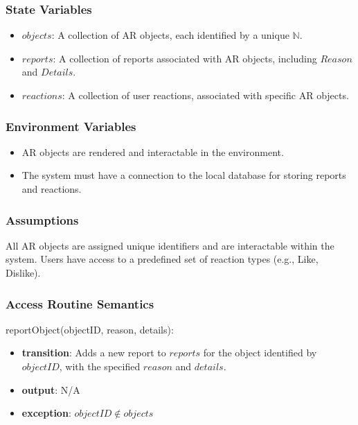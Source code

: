 \documentclass[12pt, titlepage]{article}
\begin{document}
\subsubsection{State Variables}

\begin{itemize}
  \item \( objects \): A collection of AR objects, each identified by a unique \( \mathbb{N} \).
  \item \( reports \): A collection of reports associated with AR objects, including \( Reason \) and \( Details \).
  \item \( reactions \): A collection of user reactions, associated with specific AR objects.
\end{itemize}

\subsubsection{Environment Variables}

\begin{itemize}
  \item AR objects are rendered and interactable in the environment.
  \item The system must have a connection to the local database for storing reports and reactions.
\end{itemize}

\subsubsection{Assumptions}

All AR objects are assigned unique identifiers and are interactable within the system. Users have access to a predefined set of reaction types (e.g., Like, Dislike).

\subsubsection{Access Routine Semantics}

\noindent reportObject(objectID, reason, details):
\begin{itemize}
  \item \textbf{transition}:
        Adds a new report to \( reports \) for the object identified by \( objectID \), with the specified \( reason \) and \( details \).
  \item \textbf{output}: N/A
  \item \textbf{exception}: \( objectID \notin objects \)
\end{itemize}
\end{document}
